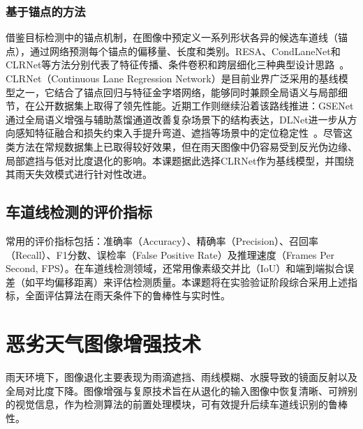 \subsubsection{基于锚点的方法}
借鉴目标检测中的锚点机制，在图像中预定义一系列形状各异的候选车道线（锚点），通过网络预测每个锚点的偏移量、长度和类别。RESA、CondLaneNet和CLRNet等方法分别代表了特征传播、条件卷积和跨层细化三种典型设计思路~\cite{zheng2021,liu2021,zheng2022clrnet}。CLRNet（Continuous Lane Regression Network）是目前业界广泛采用的基线模型之一，它结合了锚点回归与特征金字塔网络，能够同时兼顾全局语义与局部细节，在公开数据集上取得了领先性能。近期工作则继续沿着该路线推进：GSENet通过全局语义增强与辅助蒸馏通道改善复杂场景下的结构表达，DLNet进一步从方向感知特征融合和损失约束入手提升弯道、遮挡等场景中的定位稳定性~\cite{su2024gsenet,lu2025dlnet}。尽管这类方法在常规数据集上已取得较好效果，但在雨天图像中仍容易受到反光伪边缘、局部遮挡与低对比度退化的影响。本课题据此选择CLRNet作为基线模型，并围绕其雨天失效模式进行针对性改进。

\subsection{车道线检测的评价指标}
常用的评价指标包括：准确率（Accuracy）、精确率（Precision）、召回率（Recall）、F1分数、误检率（False Positive Rate）及推理速度（Frames Per Second, FPS）。在车道线检测领域，还常用像素级交并比（IoU）和端到端拟合误差（如平均偏移距离）来评估检测质量。本课题将在实验验证阶段综合采用上述指标，全面评估算法在雨天条件下的鲁棒性与实时性。

\section{恶劣天气图像增强技术}
\label{sec:image_enhancement}
雨天环境下，图像退化主要表现为雨滴遮挡、雨线模糊、水膜导致的镜面反射以及全局对比度下降。图像增强与复原技术旨在从退化的输入图像中恢复清晰、可辨别的视觉信息，作为检测算法的前置处理模块，可有效提升后续车道线识别的鲁棒性。

